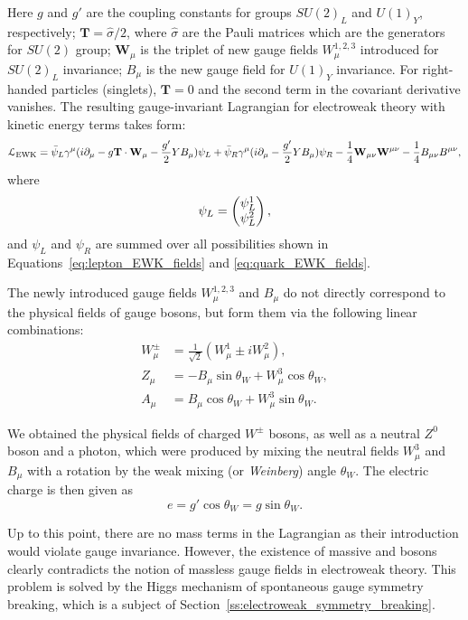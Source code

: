 Here $g$ and $g'$ are the coupling constants for groups $SU(2)_L$ and $U(1)_Y$, respectively; $\mathbf{T} =
\hat{\sigma}/2$, where $\hat{\sigma}$ are the Pauli matrices which are the generators for $SU(2)$ group;
$\mathbf{W}_\mu$ is the triplet of new gauge fields $W^{1,2,3}_\mu$ introduced for $SU(2)_L$ invariance; $B_\mu$ is the
new gauge field for $U(1)_Y$ invariance. For right-handed particles (singlets), $\mathbf{T} = 0$ and the second term in
the covariant derivative vanishes. The resulting gauge-invariant Lagrangian for electroweak theory with kinetic energy
terms takes form:
\begin{equation}
\label{eq:EWK_L}
\mathcal{L}_\textrm{EWK} = \bar{\psi}_L \gamma^\mu ( i\partial_\mu  - g \mathbf{T} \cdot \mathbf{W}_\mu - \frac{g'}{2} Y
B_\mu) \psi_L + \bar{\psi}_R \gamma^\mu (i \partial_\mu - \frac{g'}{2} Y B_\mu) \psi_R - \frac{1}{4}\mathbf{W}_{\mu\nu}
\mathbf{W}^{\mu\nu} -\frac{1}{4}B_{\mu\nu} B^{\mu\nu},
\end{equation}
where
\begin{equation*}
\psi_L = \begin{pmatrix} \psi^1_L \\ \psi^2_L \end{pmatrix},
\end{equation*}
and $\psi_L$ and $\psi_R$ are summed over all possibilities shown in Equations~\ref{eq:lepton_EWK_fields} and
\ref{eq:quark_EWK_fields}.

The newly introduced gauge fields $W^{1,2,3}_\mu$ and $B_\mu$ do not directly correspond to the physical fields of
gauge bosons, but form them via the following linear combinations:
\begin{subequations}
\begin{align}
W^{\pm}_\mu & = \frac{1}{\sqrt{2}} (W^1_\mu \pm  i W^2_\mu), \label{eq:W_mu} \\
Z_\mu & = - B_\mu \sin{\theta_W} + W^3_\mu \cos{\theta_W}, \label{eq:Z_mu} \\
A_\mu & = B_\mu \cos{\theta_W} + W^3_\mu \sin{\theta_W}. \label{eq:A_mu}
\end{align}
\end{subequations}

We obtained the physical fields of charged $W^{\pm}$ bosons, as well as a neutral $Z^0$ boson and a photon, which were
produced by mixing the neutral fields $W^3_\mu$ and $B_\mu$ with a rotation by the weak mixing (or
\textit{Weinberg}) angle $\theta_W$. The electric charge is then given as
\begin{equation}
e = g' \cos{\theta_W} = g \sin{\theta_W}.
\end{equation}

Up to this point, there are no mass terms in the Lagrangian as their introduction would violate gauge invariance.
However, the existence of massive \W and \Z bosons clearly contradicts the notion of massless gauge fields in
electroweak theory. This problem is solved by the Higgs mechanism of spontaneous gauge symmetry breaking, which is a
subject of Section~\ref{ss:electroweak_symmetry_breaking}.


